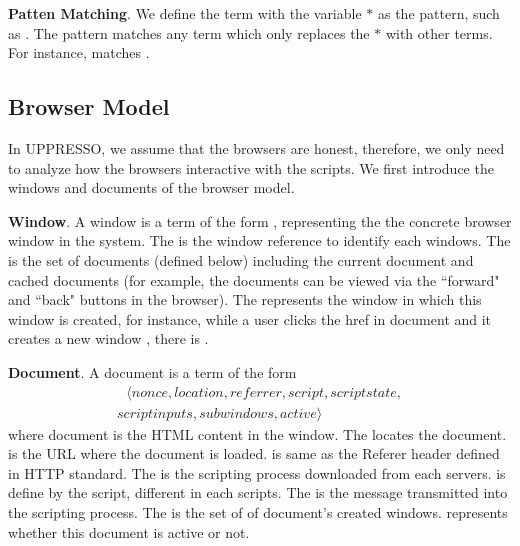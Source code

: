 \vspace{1mm}\noindent\textbf{Patten Matching}.  We define the term with the variable $*$ as the pattern, such as . 
The pattern matches any term which only replaces the $*$ with other terms. For instance,   matches .

\subsection{Browser Model}
In UPPRESSO, we assume that the browsers are honest, therefore, we only need to analyze how the browsers interactive with the scripts. 
We first introduce the windows and documents of the browser model.

\vspace{1mm}
\noindent\textbf{Window}. A window  is a term of the form , representing the  the concrete browser window in the system. The  is the window reference to identify each windows. The  is the set of documents (defined below) including the current document and cached documents (for example, the documents can be viewed via the ``forward" and ``back" buttons in the browser). The  represents the window in which this window is created, for instance, while a user clicks the href in document  and it creates a new window , there is .

\vspace{1mm}
\noindent\textbf{Document}. A document  is a term of the form
\begin{multline*}
  \ \ \ \langle nonce, location, referrer, script, scriptstate, \\
  scriptinputs, subwindows, active \rangle \ \ \ 
\end{multline*}
where document is the HTML content in the window.  The  locates the document.  is the URL where the document is loaded.  is same as the Referer header defined in HTTP standard. The  is the scripting process downloaded from each servers.  is define by the script, different in each scripts. The  is the message transmitted into the scripting process. The  is the set of  of document's created windows.  represents whether this document is active or not.

